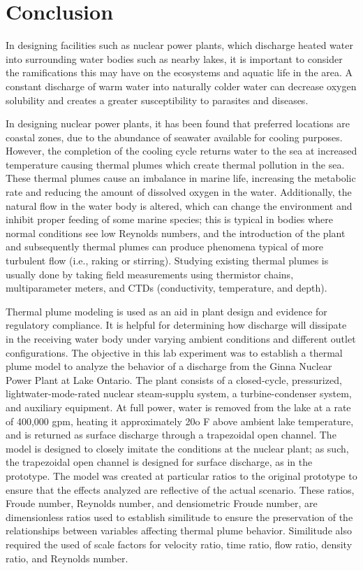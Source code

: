 \documentclass{article}
\begin{document}
\section{Conclusion}
\par In designing facilities such as nuclear power plants, which discharge heated water into surrounding water bodies such as nearby lakes, it is important to consider the ramifications this may have on the ecosystems and aquatic life in the area. A constant discharge of warm water into naturally colder water can decrease oxygen solubility and creates a greater susceptibility to parasites and diseases.  
\par In designing nuclear power plants, it has been found that preferred locations are coastal zones, due to the abundance of seawater available for cooling purposes. However, the completion of the cooling cycle returns water to the sea at increased temperature causing thermal plumes which create thermal pollution in the sea. These thermal plumes cause an imbalance in marine life, increasing the metabolic rate and reducing the amount of dissolved oxygen in the water. Additionally, the natural flow in the water body is altered, which can change the environment and inhibit proper feeding of some marine species; this is typical in bodies where normal conditions see low Reynolds numbers, and the introduction of the plant and subsequently thermal plumes can produce phenomena typical of more turbulent flow (i.e., raking or stirring). Studying existing thermal plumes is usually done by taking field measurements using thermistor chains, multiparameter meters, and CTDs (conductivity, temperature, and depth).  
\par Thermal plume modeling is used as an aid in plant design and evidence for regulatory compliance. It is helpful for determining how discharge will dissipate in the receiving water body under varying ambient conditions and different outlet configurations. The objective in this lab experiment was to establish a thermal plume model to analyze the behavior of a discharge from the Ginna Nuclear Power Plant at Lake Ontario. The plant consists of a closed-cycle, pressurized, lightwater-mode-rated nuclear steam-supplu system, a turbine-condenser system, and auxiliary equipment. At full power, water is removed from the lake at a rate of 400,000 gpm, heating it approximately 20o F above ambient lake temperature, and is returned as surface discharge through a trapezoidal open channel. The model is designed to closely imitate the conditions at the nuclear plant; as such, the trapezoidal open channel is designed for surface discharge, as in the prototype. The model was created at particular ratios to the original prototype to ensure that the effects analyzed are reflective of the actual scenario. These ratios, Froude number, Reynolds number, and densiometric Froude number, are dimensionless ratios used to establish similitude to ensure the preservation of the relationships between variables affecting thermal plume behavior. Similitude also required the used of scale factors for velocity ratio, time ratio, flow ratio, density ratio, and Reynolds number.  
\end{document}
